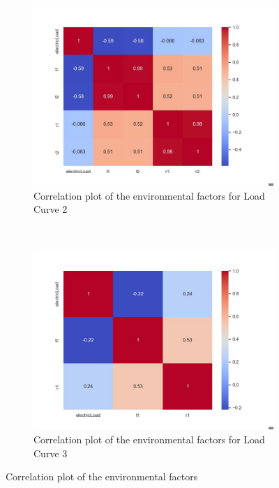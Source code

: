 \documentclass{article} %
\begin{document}
\begin{figure}[H]
    \centering
    \begin{subfigure}[b]{\textwidth}
        \centering
        \includegraphics[width=\textwidth]{ressources/Environmental/CorrelationElectricLoadFeatures.jpg}
        \caption{Correlation plot of the environmental factors for Load Curve 2}
        \label{fig:Environmental2}
    \end{subfigure}
    \\
    \begin{subfigure}[b]{\textwidth}
        \centering
        \includegraphics[width=\textwidth]{ressources/Environmental/CorrelationElectricLoadFeatures(1).jpg}
        \caption{Correlation plot of the environmental factors for Load Curve 3}
        \label{fig:Environmental3}
    \end{subfigure}
    \caption{Correlation plot of the environmental factors}
    \label{fig:Environmental}
\end{figure}
\end{document}
